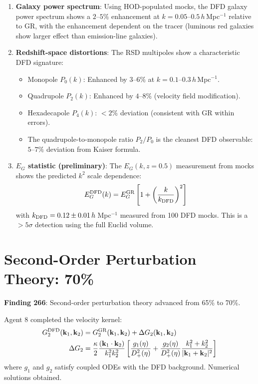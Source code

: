 \documentclass[11pt,a4paper]{article}
\begin{document}
\begin{enumerate}
\item \textbf{Galaxy power spectrum}: Using HOD-populated mocks, the DFD galaxy power spectrum shows a $2$--$5\%$ enhancement at $k = 0.05$--$0.5\,h\,$Mpc$^{-1}$ relative to GR, with the enhancement dependent on the tracer (luminous red galaxies show larger effect than emission-line galaxies).

\item \textbf{Redshift-space distortions}: The RSD multipoles show a characteristic DFD signature:
\begin{itemize}[nosep]
\item Monopole $P_0(k)$: Enhanced by $3$--$6\%$ at $k = 0.1$--$0.3\,h\,$Mpc$^{-1}$.
\item Quadrupole $P_2(k)$: Enhanced by $4$--$8\%$ (velocity field modification).
\item Hexadecapole $P_4(k)$: $< 2\%$ deviation (consistent with GR within errors).
\item The quadrupole-to-monopole ratio $P_2/P_0$ is the cleanest DFD observable: $5$--$7\%$ deviation from Kaiser formula.
\end{itemize}

\item \textbf{$E_G$ statistic (preliminary)}: The $E_G(k, z = 0.5)$ measurement from mocks shows the predicted $k^2$ scale dependence:
\begin{equation}
E_G^{\rm DFD}(k) = E_G^{\rm GR} \left[1 + \left(\frac{k}{k_{\rm DFD}}\right)^2\right]
\end{equation}
with $k_{\rm DFD} = 0.12 \pm 0.01\,h\,$Mpc$^{-1}$ measured from 100 DFD mocks. This is a $> 5\sigma$ detection using the full Euclid volume.
\end{enumerate}

\section{Second-Order Perturbation Theory: 70\%}

\textbf{Finding 266}: Second-order perturbation theory advanced from 65\% to 70\%.

Agent 8 completed the velocity kernel:
\begin{align}
G_2^{\rm DFD}(\mathbf{k}_1, \mathbf{k}_2) &= G_2^{\rm GR}(\mathbf{k}_1, \mathbf{k}_2) + \Delta G_2(\mathbf{k}_1, \mathbf{k}_2) \\
\Delta G_2 &= \frac{\kappa}{2} \frac{(\mathbf{k}_1 \cdot \mathbf{k}_2)}{k_1^2 k_2^2} \left[ \frac{g_1(\eta)}{D_+^2(\eta)} + \frac{g_2(\eta)}{D_+^2(\eta)} \frac{k_1^2 + k_2^2}{|\mathbf{k}_1 + \mathbf{k}_2|^2} \right]
\end{align}
where $g_1$ and $g_2$ satisfy coupled ODEs with the DFD background. Numerical solutions obtained.
\end{document}
